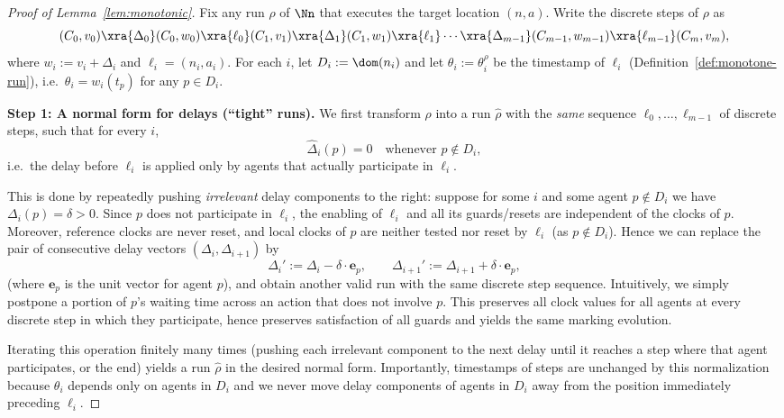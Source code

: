 \begin{proof}[Proof of Lemma~\ref{lem:monotonic}]
Fix any run $\rho$ of $\Nn$ that executes the target location $(n,a)$.
Write the discrete steps of $\rho$ as
\[
(C_0,v_0)\xra{\Delta_0}(C_0,w_0)\xra{\ell_0}(C_1,v_1)\xra{\Delta_1}(C_1,w_1)\xra{\ell_1}\cdots
\xra{\Delta_{m-1}}(C_{m-1},w_{m-1})\xra{\ell_{m-1}}(C_m,v_m),
\]
where $w_i := v_i+\Delta_i$ and $\ell_i=(n_i,a_i)$.
For each $i$, let $D_i := \dom(n_i)$ and let $\theta_i := \theta^\rho_i$ be the
timestamp of $\ell_i$ (Definition~\ref{def:monotone-run}), i.e.\
$\theta_i = w_i(t_p)$ for any $p\in D_i$.

\medskip\noindent
\textbf{Step 1: A normal form for delays (``tight'' runs).}
We first transform $\rho$ into a run $\widehat\rho$ with the \emph{same} sequence
$\ell_0,\ldots,\ell_{m-1}$ of discrete steps, such that for every $i$,
\[
\widehat\Delta_i(p)=0 \quad\text{whenever } p\notin D_i,
\]
i.e.\ the delay before $\ell_i$ is applied only by agents that actually
participate in $\ell_i$.

This is done by repeatedly pushing \emph{irrelevant} delay components to the
right: suppose for some $i$ and some agent $p\notin D_i$ we have
$\Delta_i(p)=\delta>0$. Since $p$ does not participate in $\ell_i$, the enabling
of $\ell_i$ and all its guards/resets are independent of the clocks of $p$.
Moreover, reference clocks are never reset, and local clocks of $p$ are neither
tested nor reset by $\ell_i$ (as $p\notin D_i$). Hence we can replace the pair
of consecutive delay vectors $(\Delta_i,\Delta_{i+1})$ by
\[
\Delta_i' := \Delta_i - \delta\cdot \mathbf{e}_p,
\qquad
\Delta_{i+1}' := \Delta_{i+1} + \delta\cdot \mathbf{e}_p,
\]
(where $\mathbf{e}_p$ is the unit vector for agent $p$), and obtain another
valid run with the same discrete step sequence. Intuitively, we simply postpone
a portion of $p$'s waiting time across an action that does not involve $p$.
This preserves all clock values for all agents at every discrete step in which
they participate, hence preserves satisfaction of all guards and yields the same
marking evolution.

Iterating this operation finitely many times (pushing each irrelevant component
to the next delay until it reaches a step where that agent participates, or the
end) yields a run $\widehat\rho$ in the desired normal form. Importantly,
timestamps of steps are unchanged by this normalization because $\theta_i$
depends only on agents in $D_i$ and we never move delay components of agents in
$D_i$ away from the position immediately preceding $\ell_i$.


\end{proof}
